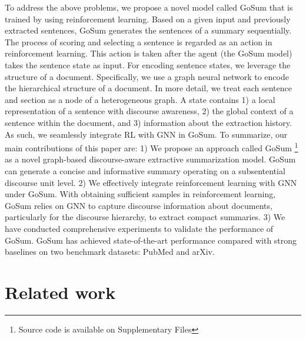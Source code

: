 \documentclass[11pt,a4paper]{article}
\begin{document}
To address the above problems, we propose a novel model called GoSum that is trained by using reinforcement learning.
Based on a given input and previously extracted sentences, GoSum generates the sentences of a summary sequentially.  
The process of scoring and selecting a sentence is regarded as an action in reinforcement learning.
This action is taken after the agent (the GoSum model) takes the  sentence state as input.
For encoding sentence states, we  leverage the  structure of a document.
Specifically,  we  use  a graph neural network to encode  the hierarchical structure of a document.
In more detail, we treat each sentence and section as a node of a heterogeneous graph.
 A state contains 1) a local representation of a sentence with discourse awareness, 2) the global context of a sentence within the document, and 3) information about  the extraction history.
As such, we seamlessly integrate RL with GNN in GoSum. To summarize, our main contributions of this paper are:
1) We propose an  approach called GoSum \footnote{Source code is available  on Supplementary Files} as a novel graph-based discourse-aware extractive summarization model. GoSum can  generate a concise and informative summary operating on a subsentential discourse unit level. 2) We effectively integrate reinforcement learning with GNN under GoSum. With obtaining sufficient samples in reinforcement learning,  GoSum relies on GNN to capture discourse information about documents, particularly for the discourse hierarchy, to extract  compact summaries. 3) We have conducted comprehensive experiments to validate the performance of GoSum. GoSum has achieved state-of-the-art performance compared with strong baselines on two benchmark datasets: PubMed and arXiv.


 \section{Related work}
\label{sec:relate}
\end{document}

